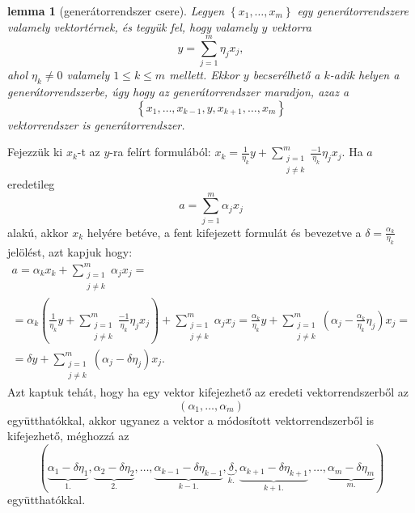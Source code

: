 \documentclass[9pt, a4paper, showtrims]{memoir}
\makeatletter
\renewenvironment{proof}[1][\proofname]
    {\par\pushQED{\qed}%
    \normalfont \topsep6\p@\@plus6\p@\relax
    \trivlist
    \item[\hskip\labelsep
        \itshape
    #1\@addpunct{:}]\ignorespaces}
    {\popQED\endtrivlist\@endpefalse}
\theoremstyle{plain}
\newtheorem{lemma}[proposition]{lemma}
\theoremstyle{remark}
\theoremstyle{definition}
\makeatother
\begin{document}
\begin{lemma}[generátorrendszer csere]\label{le:gencsere}
    Legyen $\left\{ x_1,\dots,x_m \right\}$ egy generátorrendszere valamely vektortérnek,
    és tegyük fel, hogy valamely $y$ vektorra
    \[
        y=\sum_{j=1}^m\eta_jx_j,
    \]
    ahol $\eta_k\neq 0$ valamely $1\leq k\leq m$ mellett. 
    Ekkor $y$ becserélhető a $k$-adik helyen a generátorrendszerbe, 
    úgy hogy az generátorrendszer maradjon, azaz a
    \[
        \left\{ x_1,\dots,x_{k-1},y,x_{k+1},\dots,x_m \right\}
    \]
    vektorrendszer is generátorrendszer.
\end{lemma}
\begin{proof}
    Fejezzük ki $x_k$-t az $y$-ra felírt formulából:
    \(
    x_k=\frac{1}{\eta_k}y+\sum_{\substack{j=1\\j\neq k}}^m\frac{-1}{\eta_k}\eta_jx_j.
    \)
    Ha $a$ eredetileg 
    \[
        a=\sum_{j=1}^m\alpha_jx_j
    \]
    alakú, akkor $x_k$ helyére betéve, a fent kifejezett formulát és bevezetve a 
    $\delta=\frac{\alpha_k}{\eta_k}$ jelölést, azt kapjuk hogy:
    \begin{multline*}
        a=\alpha_kx_k+\sum_{\substack{j=1\\j\neq k}}^m\alpha_jx_j=
        \\
        =
        \alpha_k
        \left( 
        \frac{1}{\eta_k}y+\sum_{\substack{j=1\\j\neq k}}^m\frac{-1}{\eta_k}\eta_jx_j
        \right)
        +\sum_{\substack{j=1\\j\neq k}}^m\alpha_jx_j
        =
        \frac{\alpha_k}{\eta_k}y+
        \sum_{\substack{j=1\\j\neq k}}^m\left( \alpha_j-\frac{\alpha_k}{\eta_k}\eta_j \right)x_j=
        \\
        =\delta y+
        \sum_{\substack{j=1\\j\neq k}}^m\left( \alpha_j-\delta\eta_j \right)x_j.
    \end{multline*}
    Azt kaptuk tehát, hogy ha egy vektor kifejezhető az eredeti vektorrendszerből az 
    \[
        \left( \alpha_1,\dots,\alpha_m \right) 
    \]
    együtthatókkal, akkor ugyanez a vektor a módosított vektorrendszerből is kifejezhető,
    méghozzá az 
    \[
        \left( 
        \underbrace{\alpha_1-\delta\eta_1}_{1.},
        \underbrace{\alpha_2-\delta\eta_2}_{2.},
        \dots,
        \underbrace{\alpha_{k-1}-\delta\eta_{k-1}}_{k-1.},
        \underbrace{\delta}_{k.},
        \underbrace{\alpha_{k+1}-\delta\eta_{k+1}}_{k+1.},\dots,
        \underbrace{\alpha_m-\delta\eta_m}_{m.}
        \right)
    \]
    együtthatókkal.
\end{proof}
\end{document}
